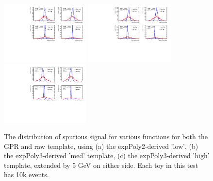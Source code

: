 \begin{figure} 
\begin{center}
  \includegraphics[width=0.4\textwidth]{figures/background/gpr/validation/padded/ToyTest_FitSigVals_lowpT_10k_noSig}   
  \includegraphics[width=0.4\textwidth]{figures/background/gpr/validation/padded/ToyTest_FitSigVals_medpT_10k_noSig}   
  \includegraphics[width=0.4\textwidth]{figures/background/gpr/validation/padded/ToyTest_FitSigVals_highpT_10k_noSig}   
\caption{The distribution of spurious signal for various functions for both the GPR and raw template, using (a) the expPoly2-derived 'low', (b) the expPoly3-derived 'med' template, (c) the expPoly3-derived 'high' template, extended by 5 GeV on either side. Each toy in this test has 10k events.}
\label{fig:padded_lowpt_10k_noSig}
\end{center}
\end{figure}


